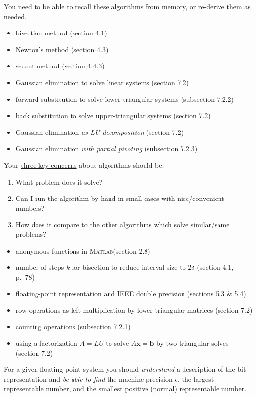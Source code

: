 \documentclass[12pt]{amsart}
\newcommand{\bb}{\mathbf{b}}
\newcommand{\bx}{\mathbf{x}}
\newcommand{\eps}{\epsilon}
\newcommand{\Matlab}{\textsc{Matlab}\xspace}
\begin{document}
  You need to be able to recall these algorithms from memory, or re-derive them as needed.
  \begin{itemize}
  \item  bisection method (section 4.1)
  \item  Newton's method (section 4.3)
  \item  secant method (section 4.4.3)
  \item  Gaussian elimination to solve linear systems (section 7.2)
  \item  forward substitution to solve lower-triangular systems (subsection 7.2.2)
  \item  back substitution to solve upper-triangular systems (section 7.2)
  \item  Gaussian elimination \emph{as LU decomposition} (section 7.2)
  \item  Gaussian elimination \emph{with partial pivoting} (subsection 7.2.3)
  \end{itemize}
Your \underline{three key concerns} about algorithms should be:
\begin{enumerate}
\item What problem does it solve?
\item Can I run the algorithm by hand in small cases with nice/convenient numbers?
\item How does it compare to the other algorithms which solve similar/same problems?
\end{enumerate}

  \begin{itemize}
  \item anonymous functions in \Matlab (section 2.8)
  \item number of steps $k$ for bisection to reduce interval size to $2\delta$ (section 4.1, p.~78)
  \item floating-point representation and IEEE double precision (sections 5.3 \& 5.4)
  \item row operations as left multiplication by lower-triangular matrices (section 7.2)
  \item counting operations (subsection 7.2.1)
  \item using a factorization $A=LU$ to solve $A\bx=\bb$ by two triangular solves (section 7.2)
  \end{itemize}
For a given floating-point system you should \emph{understand} a description of the bit representation and \emph{be able to find} the machine precision $\eps$, the largest representable number, and the smallest positive (normal) representable number.
\end{document}
